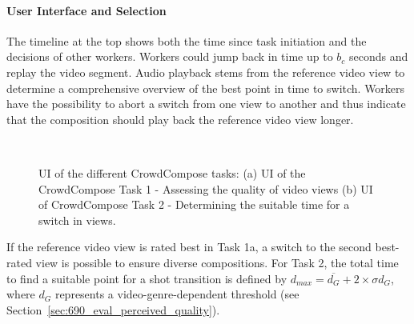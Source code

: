 \paragraph{User Interface and Selection} 
The timeline at the top shows both the time since task initiation and the decisions of other workers. 
Workers could jump back in time up to $b_c$ seconds and replay the video segment. 
Audio playback stems from the reference video view to determine a comprehensive overview of the best point in time to switch. 
Workers have the possibility to abort a switch from one view to another and thus indicate that the composition should play back the reference video view longer.
\begin{figure}[htb]
\centering
{}\\
\caption[UI of the different CrowdCompose tasks]{UI of the different CrowdCompose tasks: (a) UI of the CrowdCompose Task 1 - Assessing the quality of video views (b) UI of CrowdCompose Task 2 - Determining the suitable time for a switch in views.}
\label{fig:620_ui_task2}
\end{figure}
If the reference video view is rated best in Task 1a, a switch to the second best-rated view is possible to ensure diverse compositions. 
For Task 2, the total time to find a suitable point for a shot transition is defined by $d_{max} = \overline{d_{G}}+2 \times \sigma d_{G}$, where $d_{G}$ represents a video-genre-dependent threshold (see Section~\ref{sec:690_eval_perceived_quality}).
